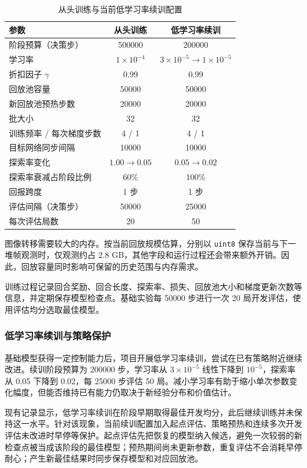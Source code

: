 \begin{table}[!htbp]
 \centering\small
 \caption{从头训练与当前低学习率续训配置}\label{tab:hyper}
 \begin{tabularx}{\linewidth}{Y c c}
 \toprule
 参数 & 从头训练 & 低学习率续训\\
 \midrule
 阶段预算（决策步） & 500000 & 200000\\
 学习率 & $1\times10^{-4}$ & $3\times10^{-5}\rightarrow1\times10^{-5}$\\
 折扣因子 $\gamma$ & 0.99 & 0.99\\
 回放池容量 & 50000 & 50000\\
 新回放池预热步数 & 20000 & 20000\\
 批大小 & 32 & 32\\
 训练频率 / 每次梯度步数 & 4 / 1 & 4 / 1\\
 目标网络同步间隔 & 10000 & 10000\\
 探索率变化 & $1.00\rightarrow0.05$ & $0.05\rightarrow0.02$\\
 探索率衰减占阶段比例 & 60\% & 100\%\\
 回报跨度 & 1 步 & 1 步\\
 评估间隔（决策步） & 50000 & 25000\\
 每次评估局数 & 20 & 50\\
 \bottomrule
 \end{tabularx}
\end{table}

图像转移需要较大的内存。按当前回放规模估算，分别以 \texttt{uint8} 保存当前与下一堆帧观测时，仅观测约占 2.8 GB，其他字段和运行过程还会带来额外开销。因此，回放容量同时影响可保留的历史范围与内存需求。

训练过程记录回合奖励、回合长度、探索率、损失、回放池大小和梯度更新次数等信息，并定期保存模型检查点。基础实验每 50000 步进行一次 20 局开发评估，使用评估均分选取最佳模型。

\subsubsection{低学习率续训与策略保护}
基础模型获得一定控制能力后，项目开展低学习率续训，尝试在已有策略附近继续改进。续训阶段预算为 200000 步，学习率从 $3\times10^{-5}$ 线性下降到 $10^{-5}$，探索率从 0.05 下降到 0.02，每 25000 步评估 50 局。减小学习率有助于缩小单次参数变化幅度，但能否维持已有能力仍取决于新经验分布和价值估计。

现有记录显示，低学习率续训在阶段早期取得最佳开发均分，此后继续训练并未保持这一水平。针对该现象，当前续训配置加入起点评估、策略预热和连续多次开发评估未改进时早停等保护。起点评估先把恢复的模型纳入候选，避免一次较弱的新检查点被当成该阶段的最佳模型；预热期间尚未更新参数，重复评估不会消耗早停耐心；产生新最佳结果时同步保存模型和对应回放池。

